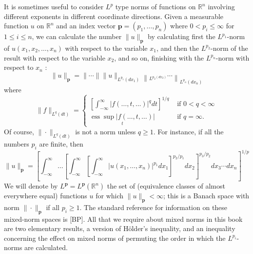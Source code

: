 \begin{para}
  It is sometimes useful to consider $L^p$ type norms of functions on $\mathbb{R}^n$ involving different exponents in different coordinate directions. Given a measurable function $u$ on $\mathbb{R}^n$ and an index vector $\mathbf{p}=\left(p_1, \ldots, p_n\right)$ where $0<p_i \leq \infty$ for $1 \leq i \leq n$, we can calculate the number $\|u\|_{\mathbf{p}}$ by calculating first the $L^{p_1}$-norm of $u\left(x_1, x_2, \ldots, x_n\right)$ with respect to the variable $x_1$, and then the $L^{p_2}$-norm of the result with respect to the variable $x_2$, and so on, finishing with the $L^{p_n}$-norm with respect to $x_n$ :
  \[
  \|u\|_{\mathbf{p}}=\|\cdots\|\|u\|_{L^{p_1}\left(d x_1\right)}\left\|_{L^{p_2\left(d x_2\right)}} \cdots\right\|_{L^{p_n}\left(d x_n\right)}
  \]
  where
  \[
  \|f\|_{L^q(d t)}= \begin{cases}{\left[\int_{-\infty}^{\infty}|f(\ldots, t, \ldots)|^q d t\right]^{1 / q}} & \text { if } 0<q<\infty \\ \underset{t}{\operatorname{ess} \sup |f(\ldots, t, \ldots)|} & \text { if } q=\infty .\end{cases}
  \]
  Of course, $\|\cdot\|_{L^q(d t)}$ is not a norm unless $q \geq 1$. For instance, if all the numbers $p_i$ are finite, then
  \[
  \|u\|_{\mathbf{p}}=\left[\int_{-\infty}^{\infty} \ldots\left[\int_{-\infty}^{\infty}\left[\int_{-\infty}^{\infty}\left|u\left(x_1, \ldots, x_n\right)\right|^{p_1} d x_1\right]^{p_2 / p_1} d x_2\right]^{p_3 / p_2} d x_3 \cdots d x_n\right]^{1 / p}
  \]
  We will denote by $L^{\mathbf{p}}=L^{\mathbf{p}}\left(\mathbb{R}^n\right)$ the set of (equivalence classes of almost everywhere equal) functions $u$ for which $\|u\|_{\mathbf{p}}<\infty$; this is a Banach space with norm $\|\cdot\|_{\mathbf{p}}$ if all $p_i \geq 1$. The standard reference for information on these mixed-norm spaces is [BP]. All that we require about mixed norms in this book are two elementary results, a version of Hölder's inequality, and an inequality concerning the effect on mixed norms of permuting the order in which the $L^{p_i}$-norms are calculated.
\end{para}

